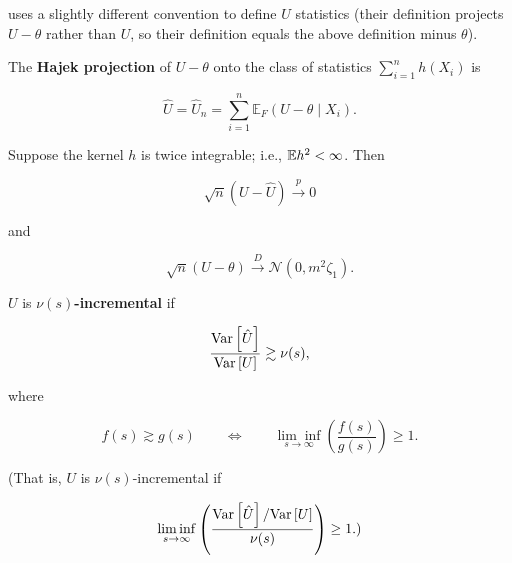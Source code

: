\citet{dasgupta2008asymptotic} uses a slightly different convention to define \(U\) statistics (their definition projects \(U - \theta\) rather than \(U\), so their definition equals the above definition minus \(\theta\)).

\begin{definition}

The \textbf{Hajek projection} of \(U - \theta\) onto the class of statistics \(\sum_{i=1}^n h(X_i)\) is

\[
\hat{U} = \hat{U}_n = \sum_{i=1}^n \mathbb{E}_F(U - \theta \mid X_i) .
\]


\end{definition}

\begin{theorem}

Suppose the kernel \(h\) is twice integrable; i.e., \(\E h^2 < \infty\). Then

\[
\sqrt{n}(U - \hat{U}) \xrightarrow{p} 0
\]

and

\[
\sqrt{n}(U - \theta) \xrightarrow{D} \mathcal{N}(0, m^2 \zeta_1).
\]

\end{theorem}

\begin{definition}

\(U\) is \textbf{\(\nu(s)\)-incremental} if 

\[
\frac{\Var\left[ \hat{U} \right]}{\Var\left[ U \right]} \gtrsim \nu(s),
\]

where

\[
f(s) \gtrsim  g(s) \qquad \iff \qquad \underset{s \to \infty}{\lim \inf} \left( \frac{f(s)}{g(s)} \right) \geq 1.
\]

(That is, \(U\) is \(\nu(s)\)-incremental if 

\[
 \underset{s \to \infty}{\lim \inf} \left( \frac{\Var\left[ \hat{U} \right] / \Var\left[ U \right]}{\nu(s)} \right) \geq 1.)
 \]

\end{definition}

%
%
%
%
%
%

